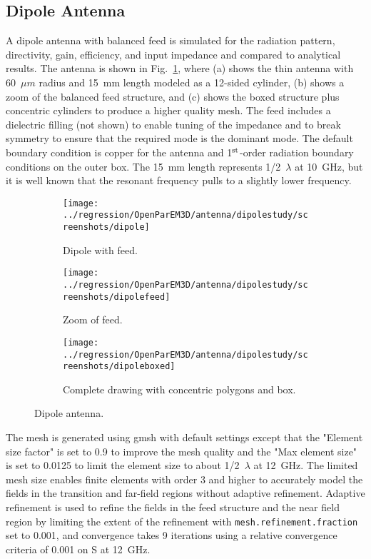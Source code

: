 \documentclass[titlepage]{article}
\renewcommand\_{\textunderscore\linebreak[1]}
\begin{document}
\subsection{Dipole Antenna}

A dipole antenna with balanced feed is simulated for the radiation pattern, directivity, gain, efficiency, and input impedance and compared to analytical results.  The antenna is shown in Fig.~\ref{fig:dipole_antenna}, where (a) shows the thin antenna with 60~$\mu m$ radius and 15~mm length modeled as a 12-sided cylinder, (b) shows a zoom of the balanced feed structure, and (c) shows the boxed structure plus concentric cylinders to produce a higher quality mesh.  The feed includes a dielectric filling (not shown) to enable tuning of the impedance and to break symmetry to ensure that the required mode is the dominant mode.  The default boundary condition is copper for the antenna and 1$^{\textnormal{st}}$-order radiation boundary conditions on the outer box.  The 15~mm length represents 1/2~$\lambda$ at 10~GHz, but it is well known that the resonant frequency pulls to a slightly lower frequency.

\begin{figure}[H]
  \centering
  \begin{subfigure}[t]{0.0125\textwidth}
     \texttt{[image: ../regression/OpenParEM3D/antenna/dipole\_study/screenshots/dipole]}
     \caption{Dipole with feed.}
  \end{subfigure}
  \hspace{1cm}
  \begin{subfigure}[t]{0.2\textwidth}
     \texttt{[image: ../regression/OpenParEM3D/antenna/dipole\_study/screenshots/dipole\_feed]}
     \caption{Zoom of feed.}
  \end{subfigure}
  \hspace{1cm}
  \begin{subfigure}[t]{0.32\textwidth}
     \texttt{[image: ../regression/OpenParEM3D/antenna/dipole\_study/screenshots/dipole\_boxed]}
     \caption{Complete drawing with concentric polygons and box.}
  \end{subfigure}
  \caption{Dipole antenna.}
  \label{fig:dipole_antenna}
\end{figure}

The mesh is generated using gmsh with default settings except that the "Element size factor" is set to 0.9 to improve the mesh quality and the "Max element size" is set to 0.0125 to limit the element size to about 1/2~$\lambda$ at 12~GHz. The limited mesh size enables finite elements with order 3 and higher to accurately model the fields in the transition and far-field regions without adaptive refinement.  Adaptive refinement is used to refine the fields in the feed structure and the near field region by limiting the extent of the refinement with \texttt{mesh.refinement.fraction} set to 0.001, and convergence takes 9 iterations using a relative convergence criteria of 0.001 on S at 12~GHz.
\end{document}
